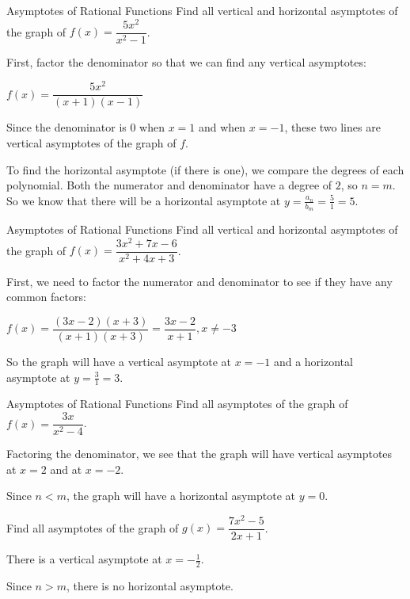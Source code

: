 \documentclass[t]{beamer}
\begin{document}
	\begin{frame}{Asymptotes of Rational Functions}
		Find all vertical and horizontal asymptotes of the graph of $f(x) = \dfrac{5x^2}{x^2 - 1}$. \pause
		
		First, factor the denominator so that we can find any vertical asymptotes:
		
		$f(x) = \dfrac{5x^2}{(x+1)(x-1)}$
		
		\pause Since the denominator is $0$ when $x = 1$ and when $x = -1$, these two lines are vertical asymptotes of the graph of $f$.
		
		\pause To find the horizontal asymptote (if there is one), we compare the degrees of each polynomial. \pause Both the numerator and denominator have a degree of $2$, so $n = m$. \pause So we know that there will be a horizontal asymptote at $y = \frac{a_n}{b_m} = \frac{5}{1} = 5$.
	\end{frame}

	\begin{frame}{Asymptotes of Rational Functions}
		Find all vertical and horizontal asymptotes of the graph of $f(x) = \dfrac{3x^2 + 7x - 6}{x^2 + 4x + 3}$. \pause
		
		First, we need to factor the numerator and denominator to see if they have any common factors: \pause
		
		$f(x) = \dfrac{(3x-2)(x+3)}{(x+1)(x+3)} = \dfrac{3x-2}{x+1}, x\neq -3$ \pause
		
		So the graph will have a vertical asymptote at $x = -1$ and a horizontal asymptote at $y = \frac{3}{1} = 3$.
	\end{frame}

	\begin{frame}{Asymptotes of Rational Functions}
		Find all asymptotes of the graph of $f(x) = \dfrac{3x}{x^2 - 4}$. \pause
		
		Factoring the denominator, we see that the graph will have vertical asymptotes at $x = 2$ and at $x = -2$. \pause
		
		Since $n < m$, the graph will have a horizontal asymptote at $y = 0$. \vspace{12pt} \pause
		
		Find all asymptotes of the graph of $g(x) = \dfrac{7x^2 - 5}{2x + 1}$. \pause
		
		There is a vertical asymptote at $x = -\frac12$. \pause
		
		Since $n > m$, there is no horizontal asymptote.
	\end{frame}
\end{document}
